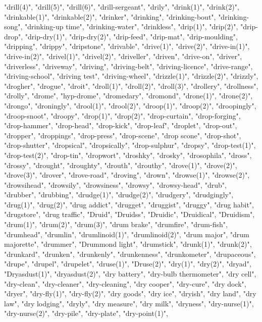"drill(4)",
"drill(5)",
"drill(6)",
"drill-sergeant",
"drily",
"drink(1)",
"drink(2)",
"drinkable(1)",
"drinkable(2)",
"drinker",
"drinking",
"drinking-bout",
"drinking-song",
"drinking-up time",
"drinking-water",
"drinkless",
"drip(1)",
"drip(2)",
"drip-drop",
"drip-dry(1)",
"drip-dry(2)",
"drip-feed",
"drip-mat",
"drip-moulding",
"dripping",
"drippy",
"dripstone",
"drivable",
"drive(1)",
"drive(2)",
"drive-in(1)",
"drive-in(2)",
"drivel(1)",
"drivel(2)",
"driveller",
"driven",
"drive-on",
"driver",
"driverless",
"driveway",
"driving",
"driving-belt",
"driving-licence",
"drive-range",
"driving-school",
"driving test",
"driving-wheel",
"drizzle(1)",
"drizzle(2)",
"drizzly",
"drogher",
"drogue",
"droit",
"droll(1)",
"droll(2)",
"droll(3)",
"drollery",
"drollness",
"drolly",
"drome",
"hyp-drome",
"dromedary",
"dromond",
"drone(1)",
"drone(2)",
"drongo",
"droningly",
"drool(1)",
"drool(2)",
"droop(1)",
"droop(2)",
"droopingly",
"droop-snoot",
"droopy",
"drop(1)",
"drop(2)",
"drop-curtain",
"drop-forging",
"drop-hammer",
"drop-head",
"drop-kick",
"drop-leaf",
"droplet",
"drop-out",
"dropper",
"droppings",
"drop-press",
"drop-scene",
"drop scone",
"drop-shot",
"drop-shutter",
"dropsical",
"dropsically",
"drop-sulphur",
"dropsy",
"drop-test(1)",
"drop-test(2)",
"drop-tin",
"dropwort",
"droshky",
"drosky",
"drosophila",
"dross",
"drossy",
"drought",
"droughty",
"drouth",
"drouthy",
"drove(1)",
"drove(2)",
"drove(3)",
"drover",
"drove-road",
"droving",
"drown",
"drowse(1)",
"drowse(2)",
"drowsihead",
"drowsily",
"drowsiness",
"drowsy",
"drowsy-head",
"drub",
"drubber",
"drubbing",
"drudge(1)",
"drudge(2)",
"drudgery",
"drudgingly",
"drug(1)",
"drug(2)",
"drug addict",
"drugget",
"druggist",
"druggy",
"drug habit",
"drugstore",
"drug traffic",
"Druid",
"Druidss",
"Druidic",
"Druidical",
"Druidism",
"drum(1)",
"drum(2)",
"drum(3)",
"drum brake",
"drumfire",
"drum-fish",
"drumhead",
"drumlin",
"drumlinoid(1)",
"drumlinoid(2)",
"drum major",
"drum majorette",
"drummer",
"Drummond light",
"drumstick",
"drunk(1)",
"drunk(2)",
"drunkard",
"drunken",
"drunkenly",
"drunkenness",
"drunkometer",
"drupaceous",
"drupe",
"drupel",
"drupelet",
"druse(1)",
"Druse(2)",
"dry(1)",
"dry(2)",
"dryad",
"Dryasdust(1)",
"dryasdust(2)",
"dry battery",
"dry-bulb thermometer",
"dry cell",
"dry-clean",
"dry-cleaner",
"dry-cleaning",
"dry cooper",
"dry-cure",
"dry dock",
"dryer",
"dry-fly(1)",
"dry-fly(2)",
"dry goods",
"dry ice",
"dryish",
"dry land",
"dry law",
"dry lodging",
"dryly",
"dry measure",
"dry milk",
"dryness",
"dry-nurse(1)",
"dry-nurse(2)",
"dry-pile",
"dry-plate",
"dry-point(1)",
